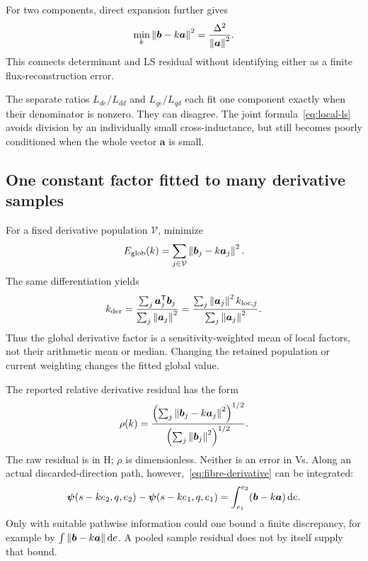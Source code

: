 For two components, direct expansion further gives
\begin{equation}
\min_k\left\lVert\bm b-k\bm a\right\rVert^2
=\frac{\Delta^2}{\left\lVert\bm a\right\rVert^2}.
\end{equation}
This connects determinant and LS residual without identifying either as a finite flux-reconstruction error.

The separate ratios $L_{de}/L_{dd}$ and $L_{qe}/L_{qd}$ each fit one component exactly when their denominator is nonzero. They can disagree. The joint formula~\eqref{eq:local-ls} avoids division by an individually small cross-inductance, but still becomes poorly conditioned when the whole vector $\bm a$ is small.

\subsection{One constant factor fitted to many derivative samples}
For a fixed derivative population $\mathcal V$, minimize
\begin{equation}
E_{\rm glob}(k)=\sum_{j\in\mathcal V}\left\lVert\bm b_j-k\bm a_j\right\rVert^2.
\end{equation}
The same differentiation yields
\begin{equation}\label{eq:global-derivative-ls}
k_{\rm der}=
\frac{\sum_j\bm a_j^{\mathsf T}\bm b_j}
{\sum_j\left\lVert\bm a_j\right\rVert^2}
=\frac{\sum_j\left\lVert\bm a_j\right\rVert^2k_{{\rm loc},j}}
{\sum_j\left\lVert\bm a_j\right\rVert^2}.
\end{equation}
Thus the global derivative factor is a sensitivity-weighted mean of local factors, not their arithmetic mean or median. Changing the retained population or current weighting changes the fitted global value.

The reported relative derivative residual has the form
\begin{equation}\label{eq:relative-derivative-residual}
\rho(k)=
\frac{\left(\sum_j\left\lVert\bm b_j-k\bm a_j\right\rVert^2\right)^{1/2}}
{\left(\sum_j\left\lVert\bm b_j\right\rVert^2\right)^{1/2}}.
\end{equation}
The raw residual is in H; $\rho$ is dimensionless. Neither is an error in Vs. Along an actual discarded-direction path, however,~\eqref{eq:fibre-derivative} can be integrated:
\begin{equation}
\bm\psi(s-ke_2,q,e_2)-\bm\psi(s-ke_1,q,e_1)
=\int_{e_1}^{e_2}(\bm b-k\bm a)\,\mathrm d e.
\end{equation}
Only with suitable pathwise information could one bound a finite discrepancy, for example by $\int\left\lVert\bm b-k\bm a\right\rVert\mathrm d e$. A pooled sample residual does not by itself supply that bound.

